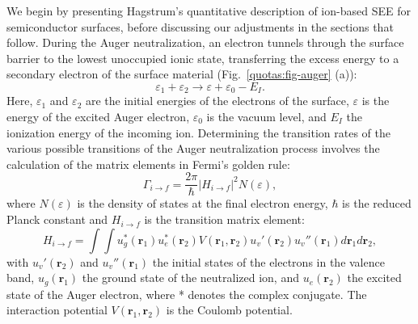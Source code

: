 \begin{refsection}
We begin by presenting Hagstrum's quantitative description of ion-based SEE 
for semiconductor surfaces, before discussing our adjustments in the sections 
that follow. During the Auger neutralization, an electron tunnels through the 
surface barrier to the lowest unoccupied ionic state, transferring the excess 
energy to a secondary electron of the surface material 
(Fig.~\ref{quotas:fig-auger} (a)): 
\begin{equation} \label{quotas:eq-energyconv} 
\varepsilon_1 + \varepsilon_2 \rightarrow \varepsilon + \varepsilon_0 - E_I. 
\end{equation} 
Here, $\varepsilon_1$ and $\varepsilon_2$ are the initial energies of the 
electrons of the surface, $\varepsilon$ is the energy of the excited Auger 
electron, $\varepsilon_0$ is the vacuum level, and $E_I$ the ionization energy 
of the incoming ion. Determining the transition rates of the various possible 
transitions of the Auger neutralization process involves the calculation of the 
matrix elements in Fermi's golden rule: 
\begin{equation} \label{quotas:eq-fermi} 
    \Gamma_{i\rightarrow f} = \frac{2\pi}{\hbar} \left| H_{i\rightarrow 
f}\right|^2 N(\varepsilon) , 
\end{equation} 
where $N(\varepsilon)$ is the density of states at the final electron energy, 
$\hbar$ is the reduced Planck constant and $H_{i\rightarrow f}$ is the 
transition matrix element: 
\begin{equation} 
    H_{i\rightarrow f} = \int \int u^*_g(\mathbf{r}_1) u^*_e(\mathbf{r}_2) 
V(\mathbf{r}_1, \mathbf{r}_2) u_v'(\mathbf{r}_2) u_v''(\mathbf{r}_1) 
d\mathbf{r}_1 d\mathbf{r}_2, 
\end{equation} 
with $ u_v'(\mathbf{r}_2)$ and $ u_v''(\mathbf{r}_1)$ the initial states of 
the electrons in the valence band, $u_g(\mathbf{r}_1)$ the ground state of the 
neutralized ion, and $u_e(\mathbf{r}_2)$ the excited state of the Auger 
electron, where * denotes the complex conjugate. The interaction potential 
$V(\mathbf{r}_1, \mathbf{r}_2)$ is the Coulomb potential. 
 

\end{refsection}
